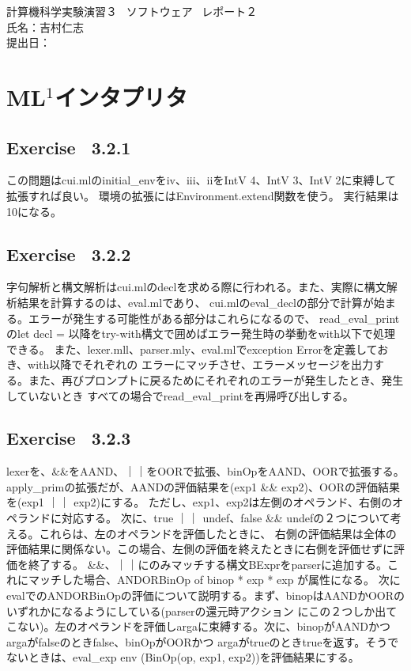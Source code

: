 \documentclass{jreport}
\begin{document}
	\begin{center}
		計算機科学実験演習３ \ ソフトウェア \ レポート２	\\
		氏名：吉村仁志	\\
		提出日：
	\newpage
	\end{center}
	\chapter{ML$^1$インタプリタ}
		\section{Exercise \ 3.2.1}
			この問題はcui.mlのinitial\_envをiv、iii、iiをIntV 4、IntV 3、IntV 2に束縛して拡張すれば良い。
			環境の拡張にはEnvironment.extend関数を使う。
			実行結果は10になる。
		\section{Exercise \ 3.2.2}
			字句解析と構文解析はcui.mlのdeclを求める際に行われる。また、実際に構文解析結果を計算するのは、eval.mlであり、
			cui.mlのeval\_declの部分で計算が始まる。エラーが発生する可能性がある部分はこれらになるので、
			read\_eval\_printのlet decl = 以降をtry-with構文で囲めばエラー発生時の挙動をwith以下で処理できる。
			また、lexer.mll、parser.mly、eval.mlでexception Errorを定義しておき、with以降でそれぞれの
			エラーにマッチさせ、エラーメッセージを出力する。また、再びプロンプトに戻るためにそれぞれのエラーが発生したとき、発生していないとき
			すべての場合でread\_eval\_printを再帰呼び出しする。
		\section{Exercise \ 3.2.3}
			lexerを、\&\&をAAND、｜｜をOORで拡張、binOpをAAND、OORで拡張する。
			apply\_primの拡張だが、AANDの評価結果を(exp1 \&\& exp2)、OORの評価結果を(exp1 ｜｜ exp2)にする。
			ただし、exp1、exp2は左側のオペランド、右側のオペランドに対応する。
			次に、true ｜｜ undef、false \&\& undefの２つについて考える。これらは、左のオペランドを評価したときに、
			右側の評価結果は全体の評価結果に関係ない。この場合、左側の評価を終えたときに右側を評価せずに評価を終了する。
			\&\&、｜｜にのみマッチする構文BExprをparserに追加する。これにマッチした場合、ANDORBinOp of binop * exp * exp が属性になる。
			次にevalでのANDORBinOpの評価について説明する。まず、binopはAANDかOORのいずれかになるようにしている(parserの還元時アクション
			にこの２つしか出てこない)。左のオペランドを評価しargaに束縛する。次に、binopがAANDかつargaがfalseのときfalse、binOpがOORかつ
			argaがtrueのときtrueを返す。そうでないときは、eval\_exp env (BinOp(op, exp1, exp2))を評価結果にする。
\end{document}
